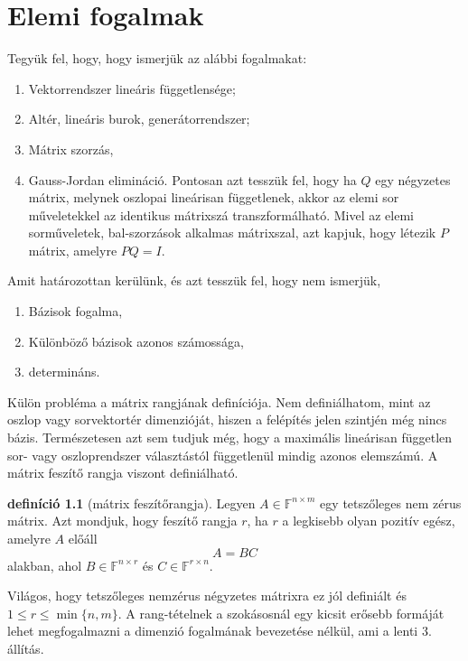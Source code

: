 \documentclass[9pt, showtrims]{memoir}
\theoremstyle{plain}
\theoremstyle{remark}
\theoremstyle{definition}
\newtheorem{definition}[proposition]{definíció}
\renewcommand{\mathbf}{\mathbb}
\begin{document}
\chapter{Elemi fogalmak}
Tegyük fel, hogy, hogy ismerjük az alábbi fogalmakat:
\begin{enumerate}
    \item Vektorrendszer lineáris függetlensége;
    \item Altér, lineáris burok, generátorrendszer;
    \item Mátrix szorzás,
    \item Gauss-Jordan elimináció. Pontosan azt tesszük fel, hogy ha $Q$ egy négyzetes mátrix, melynek oszlopai
        lineárisan függetlenek, akkor az elemi sor műveletekkel az identikus mátrixszá transzformálható.
        Mivel az elemi sorműveletek, bal-szorzások alkalmas mátrixszal, 
        azt kapjuk, hogy létezik $P$ mátrix, amelyre $PQ=I$.
\end{enumerate}
Amit határozottan kerülünk, és azt tesszük fel, hogy nem ismerjük,
\begin{enumerate}
    \item Bázisok fogalma,
    \item Különböző bázisok azonos számossága,
    \item determináns.
\end{enumerate}
Külön probléma a mátrix rangjának definíciója.
Nem definiálhatom, 
mint az oszlop vagy sorvektortér dimenzióját, hiszen a felépítés jelen szintjén még nincs bázis.
Természetesen azt sem tudjuk még, hogy a maximális lineárisan független sor- vagy oszloprendszer választástól függetlenül mindig azonos elemszámú.
A mátrix feszítő rangja viszont definiálható.
\begin{definition}[mátrix feszítőrangja]
    Legyen $A\in\mathbf{F}^{n\times m}$ egy tetszőleges nem zérus mátrix.
    Azt mondjuk, hogy feszítő rangja $r$, ha $r$ a legkisebb olyan pozitív egész, amelyre $A$ előáll
    \[
        A=BC
    \]
    alakban, ahol $B\in\mathbf{F}^{n\times r}$ és $C\in\mathbb{F}^{r\times n}$.
\end{definition}
Világos, hogy tetszőleges nemzérus négyzetes mátrixra ez jól definiált és $1\leq r \leq \min\{n,m\}$.
A rang-tételnek a szokásosnál egy kicsit erősebb formáját lehet megfogalmazni a dimenzió fogalmának bevezetése nélkül,
ami a lenti 3. állítás.
\end{document}
